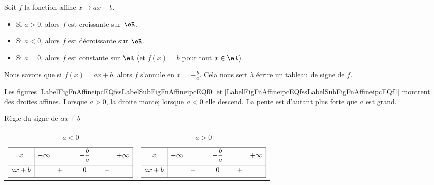 \begin{Aretenir}
      Soit $f$ la fonction affine $x\mapsto ax+b$.
      \begin{itemize}
      \item Si $a>0$, alors $f$ est croissante sur $\eR$.
      \item Si $a<0$, alors $f$ est décroissante sur $\eR$.
      \item Si $a=0$, alors $f$ est constante sur $\eR$
        (et $f(x)=b$ pour tout $x\in\eR$).
      \end{itemize}
\end{Aretenir}
Nous savons que si \( f(x)=ax+b\), alors \( f\) s'annule en \( x=-\frac{ b }{ a }\). Cela nous sert à écrire un tableau de signe de \( f\).



Les figures \ref{LabelFigFnAffineipcEQfssLabelSubFigFnAffineipcEQf0} et \ref{LabelFigFnAffineipcEQfssLabelSubFigFnAffineipcEQf1} montrent des droites affines. Lorsque \( a>0\), la droite monte; lorsque \( a<0\) elle descend. La pente est d'autant plus forte que \( a\) est grand.
\newcommand{\CaptionFigFnAffineipcEQf}{Deux droites affines.}





\begin{Aretenir}
      Règle du signe de $ax+b$ \\
      
      \begin{tabular}{cc}
        $a<0$ & $a>0$ \\
        & \\
        $\begin{array}{|c|ccccc|}
          \hline
          x & -\infty & & -\dfrac{b}{a} & & +\infty \\[2ex]
          \hline
          ax+b & & + \quad \ & 0 & \quad - & \\[1ex]
          \hline
        \end{array}$
        &
        $\begin{array}{|c|ccccc|}
          \hline
          x & -\infty & & -\dfrac{b}{a} & & +\infty \\[2ex]
          \hline
          ax+b & & - \quad \ & 0 & \quad + & \\[1ex]
          \hline
        \end{array}$ \\
      \end{tabular}  \\[1ex] 
\end{Aretenir}

